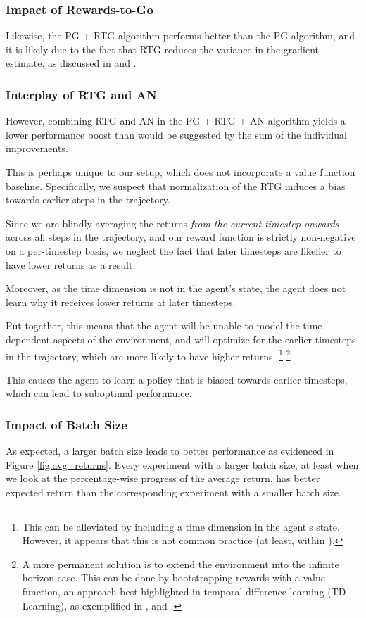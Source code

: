 \documentclass{article} %
\begin{document}
\subsubsection{Impact of Rewards-to-Go}
Likewise, the PG + RTG algorithm performs better than the PG algorithm,
and it is likely due to the fact that RTG reduces the variance in the gradient estimate,
as discussed in \cite{Levine-et-al-2023} and \cite{Week2}.

\subsubsection{Interplay of RTG and AN}
However, combining RTG and AN in the PG + RTG + AN algorithm yields a lower performance boost
than would be suggested by the sum of the individual improvements.

This is perhaps unique to our setup, which does not incorporate a value function baseline.
Specifically, we suspect that normalization of the RTG induces a bias towards earlier steps in the trajectory.

Since we are blindly averaging the returns \textit{from the current timestep onwards} across all steps in the trajectory, 
and our reward function is strictly non-negative on a per-timestep basis,
we neglect the fact that later timesteps are likelier to have lower returns as a result. 

Moreover, as the time dimension is not in the agent's state,
the agent does not learn why it receives lower returns at later timesteps.

Put together, this means that the agent will be unable to model the time-dependent aspects of the environment,
and will optimize for the earlier timesteps in the trajectory, which are more likely to have higher returns.
\footnote{
    This can be alleviated by including a time dimension in the agent's state.
    However, it appears that this is not common practice (at least, within \cite{Towers-et-al-2024}).
}
\footnote{
    A more permanent solution is to extend the environment into the infinite horizon case.
    This can be done by bootstrapping rewards with a value function,
    an approach best highlighted in temporal difference learning (TD-Learning),
    as exemplified in \cite{Sutton-1988}, and \cite{Schulman-et-al-2018}.
}

This causes the agent to learn a policy that is biased towards earlier timesteps,
which can lead to suboptimal performance.

\subsubsection{Impact of Batch Size}
As expected, a larger batch size leads to better performance as evidenced in Figure \ref{fig:avg_returns}.
Every experiment with a larger batch size, at least when we look at the percentage-wise progress of the average return,
has better expected return than the corresponding experiment with a smaller batch size.
\end{document}
